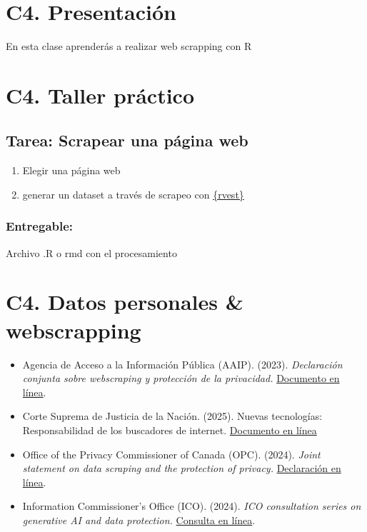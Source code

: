 \documentclass[
  letterpaper,
  DIV=11,
  numbers=noendperiod]{scrreprt}
\providecommand{\tightlist}{%
  \setlength{\itemsep}{0pt}\setlength{\parskip}{0pt}}
\begin{document}
\chapter{C4. Presentación}\label{c4.-presentaciuxf3n}

En esta clase aprenderás a realizar web scrapping con R

\chapter{C4. Taller práctico}\label{c4.-taller-pruxe1ctico}

\section{Tarea: Scrapear una página
web}\label{tarea-scrapear-una-puxe1gina-web}

\begin{enumerate}
\def\labelenumi{\arabic{enumi})}
\tightlist
\item
  Elegir una página web
\item
  generar un dataset a través de scrapeo con
  \href{https://rvest.tidyverse.org/}{\{rvest\}}
\end{enumerate}

\subsection{Entregable:}\label{entregable}

Archivo .R o rmd con el procesamiento

\chapter{C4. Datos personales \&
webscrapping}\label{c4.-datos-personales-webscrapping}

\begin{itemize}
\item
  Agencia de Acceso a la Información Pública (AAIP). (2023).
  \emph{Declaración conjunta sobre webscraping y protección de la
  privacidad.}
  \href{https://www.argentina.gob.ar/sites/default/files/declaracion_conjunta_aaip_datascraping.pdf}{Documento
  en línea}.
\item
  Corte Suprema de Justicia de la Nación. (2025). Nuevas tecnologías:
  Responsabilidad de los buscadores de internet.
  \href{https://sj.csjn.gov.ar/homeSJ/notas/nota/189/documento}{Documento
  en línea}
\item
  Office of the Privacy Commissioner of Canada (OPC). (2024).
  \emph{Joint statement on data scraping and the protection of privacy.}
  \href{https://www.priv.gc.ca/en/opc-news/speeches-and-statements/2024/js-dc_20241028/}{Declaración
  en línea}.
\item
  Information Commissioner's Office (ICO). (2024). \emph{ICO
  consultation series on generative AI and data protection.}
  \href{https://ico.org.uk/about-the-ico/ico-and-stakeholder-consultations/ico-consultation-series-on-generative-ai-and-data-protection/}{Consulta
  en línea}.
\end{itemize}
\end{document}
